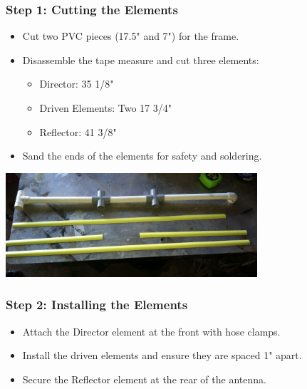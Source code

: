 \documentclass{beamer}
\begin{document}
\begin{frame}
    \frametitle{Step 1: Cutting the Elements}
    \begin{itemize}
        \item Cut two PVC pieces (17.5" and 7") for the frame.
        \item Disassemble the tape measure and cut three elements:
        \begin{itemize}
            \item Director: 35 1/8"
            \item Driven Elements: Two 17 3/4"
            \item Reflector: 41 3/8"
        \end{itemize}
        \item Sand the ends of the elements for safety and soldering.
    \end{itemize}
    \begin{center}
    \includegraphics[width=0.7\textwidth]{cutting_elements.jpg} %
    \end{center}
\end{frame}

\begin{frame}
    \frametitle{Step 2: Installing the Elements}
    \begin{itemize}
        \item Attach the Director element at the front with hose clamps.
        \item Install the driven elements and ensure they are spaced 1" apart.
        \item Secure the Reflector element at the rear of the antenna.
    \end{itemize}
\end{frame}
\end{document}
